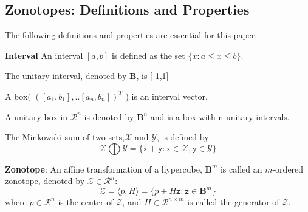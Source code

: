 \subsection{Zonotopes: Definitions and Properties}
The following definitions and properties are essential for this paper.
\begin{definition}\textbf{Interval} An interval $[a,b]$ is defined as the set $\{x : a \leq x \leq b\}$.
\begin{subdefinition}
The unitary interval, denoted by $\textbf{B}$, is [-1,1]
\end{subdefinition}
\begin{subdefinition}
A box( $( [a_1, b_1],..[a_n, b_n] )^T$ ) is an interval vector.
\end{subdefinition}
\begin{subdefinition}
A unitary box in $\mathcal{R}^n$ is denoted by $\textbf{B}^n$ and is a box with n unitary intervals.
\end{subdefinition}
\end{definition}
\begin{definition}
The Minkowski sum of two sets,$\mathcal{X}$ and $\mathcal{Y}$, is defined by: 
\begin{equation}
\mathcal{X} \bigoplus \mathcal{Y} = \{\texttt{x} + \texttt{y}: \texttt{x} \in \mathcal{X}, \texttt{y} \in \mathcal{Y}\}
\end{equation}
\end{definition}
\begin{definition}
\textbf{Zonotope}:
An affine transformation of a hypercube, $\textbf{B}^m$ is called an $m$-ordered zonotope, denoted by $\mathcal{Z}\in \mathcal{R}^n$:\\
\begin{equation}
\mathcal{Z} = \langle p, H \rangle = \{p+ H\texttt{z}: \texttt{z} \in \textbf{B}^m\}
\end{equation}
where $p \in \mathcal{R}^n$ is the center of $\mathcal{Z}$, and $H \in \mathcal{R}^{n \times m}$ is called the generator of $\mathcal{Z}$.
\end{definition}

